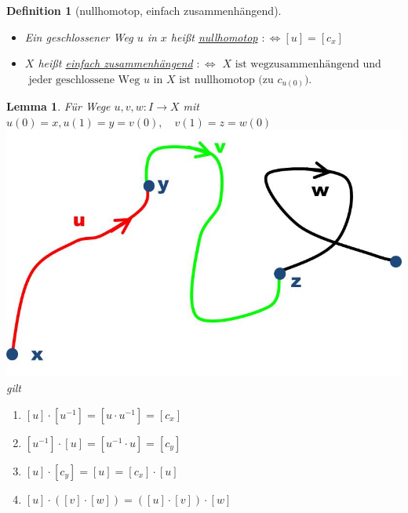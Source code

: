 \documentclass[a4paper,11pt,notitlepage]{report}
\newtheorem{definition}{Definition}[chapter]
\newtheorem{lemma}{Lemma}[chapter]
\begin{document}
\begin{definition}[nullhomotop, einfach zusammenhängend]
	\begin{itemize}
	\item Ein geschlossener Weg $u$ in $x$ heißt \underline{nullhomotop} \newline
		$:\Leftrightarrow [u] = [c_x]$
	\item $X$ heißt \underline{einfach zusammenhängend} $:\Leftrightarrow$ \newline
	$X \text{ ist wegzusammenhängend und}$ \newline $\text{ jeder geschlossene Weg $u$ in $X$ ist nullhomotop (zu $c_{u(0)}$).}$
	\end{itemize}
\end{definition}

\begin{lemma}{}
	Für Wege $u,v,w \colon I \rightarrow X$ \newline mit $u(0)=x, u(1)=y=v(0), \quad v(1)=z= w(0)$ \includegraphics[scale=0.4]{images/Produkt_Lemma.jpg} gilt
	\begin{enumerate}
		\item $[u] \cdot [u^{-1}] = [u \cdot u^{-1}] = [c_x]$
		\item $[u^{-1}] \cdot [u] = [u^{-1} \cdot u] = [c_y]$
		\item $[u] \cdot [c_y] = [u] = [c_x] \cdot [u]$
		\item $[u] \cdot ([v] \cdot [w]) = ([u] \cdot [v]) \cdot [w]$
	\end{enumerate}
\end{lemma}
\end{document}
